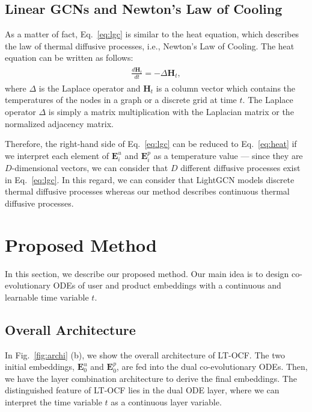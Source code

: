 \documentclass[sigconf]{acmart}
\begin{document}
\subsection{Linear GCNs and Newton's Law of Cooling}\label{sec:thermal}
As a matter of fact, Eq.~\eqref{eq:lgc} is similar to the heat equation, which describes the law of thermal diffusive processes, i.e., Newton's Law of Cooling. The heat equation can be written as follows:
\begin{align}\begin{split}\label{eq:heat}
    \frac{d \bm{H}_{t}}{dt} = -\Delta \bm{H}_{t},
\end{split}\end{align}where $\Delta$ is the Laplace operator and $\bm{H}_{t}$ is a column vector which contains the temperatures of the nodes in a graph or a discrete grid at time $t$. The Laplace operator $\Delta$ is simply a matrix multiplication with the Laplacian matrix or the normalized adjacency matrix.

Therefore, the right-hand side of Eq.~\eqref{eq:lgc} can be reduced to Eq.~\eqref{eq:heat} if we interpret each element of $\bm{E}^u_i$ and $\bm{E}^p_i$ as a temperature value --- since they are $D$-dimensional vectors, we can consider that $D$ different diffusive processes exist in Eq.~\eqref{eq:lgc}. In this regard, we can consider that LightGCN models discrete thermal diffusive processes whereas our method describes continuous thermal diffusive processes.

\section{Proposed Method}



In this section, we describe our proposed method. Our main idea is to design co-evolutionary ODEs of user and product embeddings with a continuous and learnable time variable $t$. 



\subsection{Overall Architecture}
In Fig.~\ref{fig:archi} (b), we show the overall architecture of LT-OCF. The two initial embeddings, $\bm{E}^u_0$ and $\bm{E}^p_0$, are fed into the dual co-evolutionary ODEs. Then, we have the layer combination architecture to derive the final embeddings. The distinguished feature of LT-OCF lies in the dual ODE layer, where we can interpret the time variable $t$ as a continuous layer variable.
\end{document}
